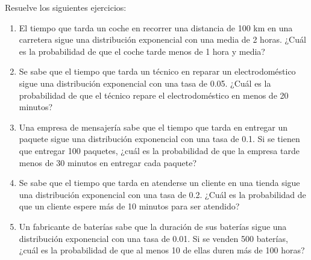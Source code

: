 \begin{Ejer}
Resuelve los siguientes ejercicios:
\begin{enumerate}

    \item El tiempo que tarda un coche en recorrer una distancia de 100 km en una carretera sigue una distribución exponencial con una media de 2 horas. ¿Cuál es la probabilidad de que el coche tarde menos de 1 hora y media?
    \item Se sabe que el tiempo que tarda un técnico en reparar un electrodoméstico sigue una distribución exponencial con una tasa de 0.05. ¿Cuál es la probabilidad de que el técnico repare el electrodoméstico en menos de 20 minutos?
    \item Una empresa de mensajería sabe que el tiempo que tarda en entregar un paquete sigue una distribución exponencial con una tasa de 0.1. Si se tienen que entregar 100 paquetes, ¿cuál es la probabilidad de que la empresa tarde menos de 30 minutos en entregar cada paquete?
    \item Se sabe que el tiempo que tarda en atenderse un cliente en una tienda sigue una distribución exponencial con una tasa de 0.2. ¿Cuál es la probabilidad de que un cliente espere más de 10 minutos para ser atendido?
    \item Un fabricante de baterías sabe que la duración de sus baterías sigue una distribución exponencial con una tasa de 0.01. Si se venden 500 baterías, ¿cuál es la probabilidad de que al menos 10 de ellas duren más de 100 horas?
 

\end{enumerate}
\end{Ejer}
